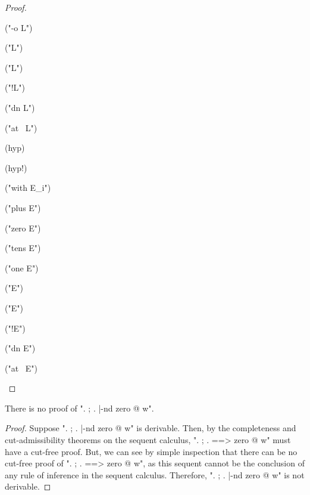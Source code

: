 \documentclass{article}
\begin{document}
\begin{lem}
\begin{proof}
\begin{ecom} ["==>"/"|-nd" {case}.]
  \item ("{-o} L")
    
  \item ("\forall L")
    
  \item ("\exists L")
    
  \item ("!L")
    
  \item ("{dn} L")
    
  \item ("at~ L")
    
  \end{ecom}

  \begin{ecom} ["|-nd"/"==>" {case}.]  
  \item (hyp)
    
  \item (hyp!)
    
  \item ("with E_i")
    
  \item ("plus E")
    
  \item ("zero E")
    
  \item ("tens E")
    
  \item ("one E")
    
  \item ("\forall E")
    
  \item ("\exists E")
    
  \item ("!E")
    
  \item ("{dn} E")
    
  \item ("at~ E")
    
  \end{ecom}
\end{proof}

\begin{cor}
  There is no proof of ". ; . |-nd zero @ w".
\end{cor}

\begin{proof}
  Suppose ". ; . |-nd zero @ w" is derivable. Then, by the completeness and cut-admissibility
  theorems on the sequent calculus, ". ; . ==> zero @ w" must have a cut-free proof. 
  But, we can see by simple inspection that there can be no cut-free proof of 
  ". ; . ==> zero @ w", as this sequent cannot be the conclusion of any rule of inference 
  in the sequent calculus. 
  Therefore, ". ; . |-nd zero @ w" is not derivable.
\end{proof}


\end{lem}
\end{document}
